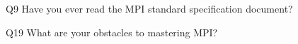 \begin{description}%
\item{Q9} Have you ever read the MPI standard specification document?%
\item{Q19} What are your obstacles to mastering MPI?%
\end{description}%
